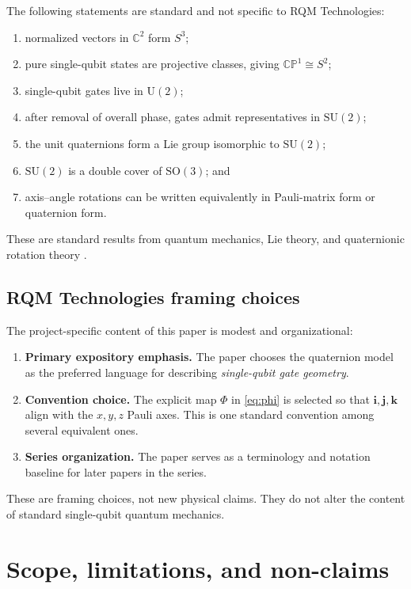 \documentclass[11pt]{article}
\theoremstyle{remark}
\newcommand{\C}{\mathbb{C}}
\newcommand{\CP}{\mathbb{CP}}
\newcommand{\SU}{\mathrm{SU}}
\newcommand{\U}{\mathrm{U}}
\newcommand{\SO}{\mathrm{SO}}
\newcommand{\ii}{\mathbf{i}}
\newcommand{\jj}{\mathbf{j}}
\newcommand{\kk}{\mathbf{k}}
\begin{document}
The following statements are standard and not specific to RQM Technologies:
\begin{enumerate}[label=(\arabic*)]
\item normalized vectors in $\C^2$ form $S^3$;
\item pure single-qubit states are projective classes, giving $\CP^1\cong S^2$;
\item single-qubit gates live in $\U(2)$;
\item after removal of overall phase, gates admit representatives in $\SU(2)$;
\item the unit quaternions form a Lie group isomorphic to $\SU(2)$;
\item $\SU(2)$ is a double cover of $\SO(3)$; and
\item axis--angle rotations can be written equivalently in Pauli-matrix form or quaternion form.
\end{enumerate}
These are standard results from quantum mechanics, Lie theory, and quaternionic rotation theory \citep{nielsen2010,hall2015,kuipers1999,penrose1984}.

\subsection{RQM Technologies framing choices}

The project-specific content of this paper is modest and organizational:
\begin{enumerate}[label=(\alph*)]
\item \textbf{Primary expository emphasis.} The paper chooses the quaternion model as the preferred language for describing \emph{single-qubit gate geometry}.
\item \textbf{Convention choice.} The explicit map $\Phi$ in \eqref{eq:phi} is selected so that $\ii,\jj,\kk$ align with the $x,y,z$ Pauli axes. This is one standard convention among several equivalent ones.
\item \textbf{Series organization.} The paper serves as a terminology and notation baseline for later papers in the series.
\end{enumerate}

These are framing choices, not new physical claims. They do not alter the content of standard single-qubit quantum mechanics.

\section{Scope, limitations, and non-claims}
\end{document}
